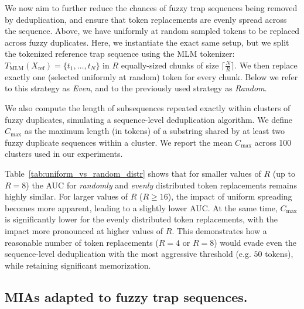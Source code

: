 We now aim to further reduce the chances of fuzzy trap sequences being removed by deduplication, and ensure that token replacements are evenly spread across the sequence. Above, we have uniformly at random sampled tokens to be replaced across fuzzy duplicates. Here, we instantiate the exact same setup, but we split the tokenized reference trap sequence using the MLM tokenizer: $T_{\text{MLM}}(X_{\text{ref}}) = \{t_1,\ldots,t_N\}$ in $R$ equally-sized chunks of size $\lceil\frac{N}{R}\rceil$. We then replace exactly one (selected uniformly at random) token for every chunk. Below we refer to this strategy as \emph{Even}, and to the previously used strategy as \emph{Random}.

We also compute the length of subsequences repeated exactly within clusters of fuzzy duplicates, simulating a sequence-level deduplication algorithm. We define $C_\text{max}$ as the maximum length (in tokens) of a substring shared by at least two fuzzy duplicate sequences within a cluster. We report the mean $C_\text{max}$ across 100 clusters used in our experiments.

Table~\ref{tab:uniform_vs_random_distr} shows that for smaller values of $R$ (up to $R=8$) the AUC for \textit{randomly} and \textit{evenly} distributed token replacements remains highly similar. For larger values of $R$ ($R \geq 16$), the impact of uniform spreading becomes more apparent, leading to a slightly lower AUC. At the same time, $C_\text{max}$ is significantly lower for the evenly distributed token replacements, with the impact more pronounced at higher values of $R$. This demonstrates how a reasonable number of token replacements ($R=4$ or $R=8$) would evade even the sequence-level deduplication with the most aggressive threshold (e.g. $50$ tokens), while retaining significant memorization.

\subsection{MIAs adapted to fuzzy trap sequences.} \label{section:adapted_mia}

